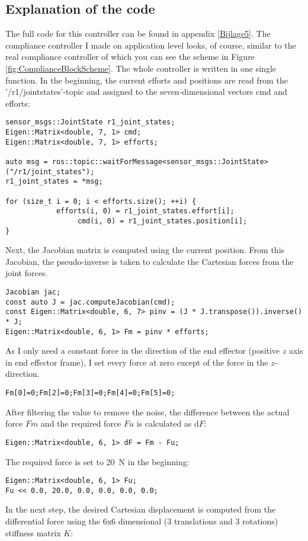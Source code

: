 \documentclass[11pt,a4paper]{report}
\begin{document}
\subsection{Explanation of the code}
The full code for this controller can be found in appendix \ref{Bijlage5}.
The compliance controller I made on application level looks, of course, similar to the real compliance controller of which you can see the scheme in Figure \ref{fig:ComplianceBlockScheme}. The whole controller is written in one single function. In the beginning, the current efforts and positions are read from the '/r1/joint\textunderscore states'-topic and assigned to the seven-dimensional vectors cmd and efforts:
\begin{verbatim}
sensor_msgs::JointState r1_joint_states;
Eigen::Matrix<double, 7, 1> cmd;
Eigen::Matrix<double, 7, 1> efforts;

auto msg = ros::topic::waitForMessage<sensor_msgs::JointState>("/r1/joint_states");
r1_joint_states = *msg;

for (size_t i = 0; i < efforts.size(); ++i) {
        	efforts(i, 0) = r1_joint_states.effort[i];
		         cmd(i, 0) = r1_joint_states.position[i];
}
\end{verbatim}
Next, the Jacobian matrix is computed using the current position. From this Jacobian, the pseudo-inverse is taken to calculate the Cartesian forces from the joint forces.
\begin{verbatim}
Jacobian jac;
const auto J = jac.computeJacobian(cmd);
const Eigen::Matrix<double, 6, 7> pinv = (J * J.transpose()).inverse() * J;
Eigen::Matrix<double, 6, 1> Fm = pinv * efforts;
\end{verbatim}
As I only need a constant force in the direction of the end effector (positive $z$ axis in end effector frame), I set every force at zero except of the force in the $z$-direction.
\begin{verbatim}
Fm[0]=0;Fm[2]=0;Fm[3]=0;Fm[4]=0;Fm[5]=0;
\end{verbatim}
After filtering the value to remove the noise, the difference between the actual force $Fm$ and the required force $Fu$ is calculated as $\mathrm{d}F$:
\begin{verbatim}
Eigen::Matrix<double, 6, 1> dF = Fm - Fu;
\end{verbatim}
The required force is set to 20~N in the beginning:
\begin{verbatim}
Eigen::Matrix<double, 6, 1> Fu;
Fu << 0.0, 20.0, 0.0, 0.0, 0.0, 0.0;
\end{verbatim}
In the next step, the desired Cartesian displacement is computed from the differential force using the 6x6 dimensional (3 translations and 3 rotations) stiffness matrix $K$:
\end{document}
